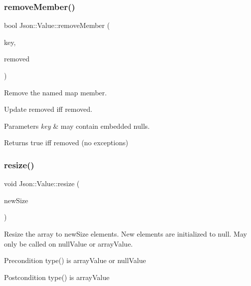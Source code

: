 \subsubsection{\texorpdfstring{remove\+Member()}{removeMember()}\hspace{0.1cm}{\footnotesize\ttfamily [4/4]}}
{\footnotesize\ttfamily bool Json\+::\+Value\+::remove\+Member (\begin{DoxyParamCaption}\item[{J\+S\+O\+N\+C\+P\+P\+\_\+\+S\+T\+R\+I\+NG const \&}]{key,  }\item[{\hyperlink{classJson_1_1Value}{Value} $\ast$}]{removed }\end{DoxyParamCaption})}



Remove the named map member. 

Update \textquotesingle{}removed\textquotesingle{} iff removed. 
\begin{DoxyParams}{Parameters}
{\em key} & may contain embedded nulls. \\
\hline
\end{DoxyParams}
\begin{DoxyReturn}{Returns}
true iff removed (no exceptions) 
\end{DoxyReturn}
\mbox{\label{classJson_1_1Value_a7a064d8aa47fde09a268be2aea992134}} 
\subsubsection{\texorpdfstring{resize()}{resize()}}
{\footnotesize\ttfamily void Json\+::\+Value\+::resize (\begin{DoxyParamCaption}\item[{Array\+Index}]{new\+Size }\end{DoxyParamCaption})}

Resize the array to new\+Size elements. New elements are initialized to null. May only be called on null\+Value or array\+Value. \begin{DoxyPrecond}{Precondition}
type() is array\+Value or null\+Value 
\end{DoxyPrecond}
\begin{DoxyPostcond}{Postcondition}
type() is array\+Value 
\end{DoxyPostcond}
\mbox{\label{classJson_1_1Value_a29f3a30f7e5d3af6f38d57999bf5b480}} 
